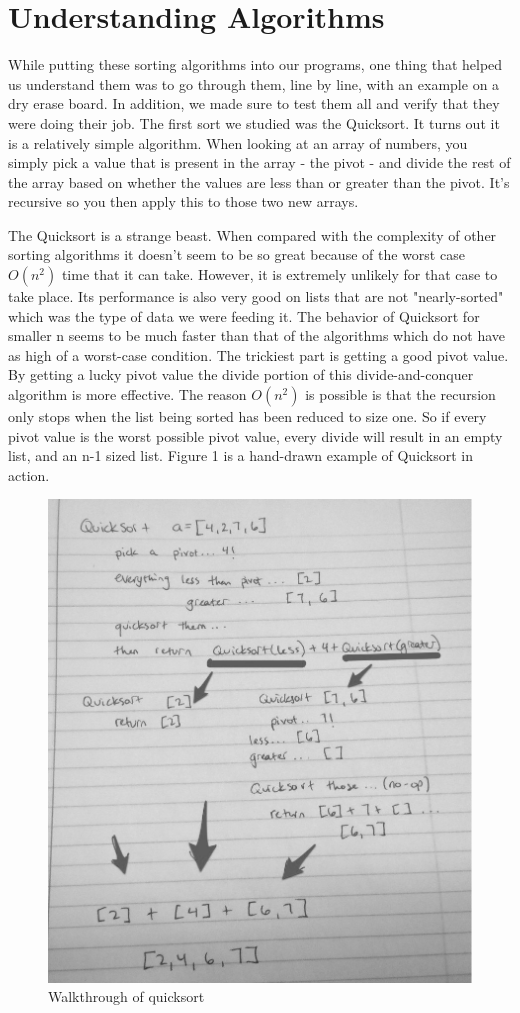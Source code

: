\documentclass[12pt]{amsart}
\begin{document}
\section*{Understanding Algorithms}

While putting these sorting algorithms into our programs, one thing that helped
us understand them was to go through them, line by line, with an example on a
dry erase board. In addition, we made sure to test them all and verify that they
were doing their job. The first sort we studied was the Quicksort. It turns out
it is a relatively simple algorithm. When looking at an array of numbers, you
simply pick a value that is present in the array - the pivot - and divide the 
rest of the array based on whether the values are less than or greater than the 
pivot. It's recursive so you then apply this to those two new arrays.

The Quicksort is a strange beast. When compared with the complexity of other
sorting algorithms it doesn't seem to be so great because of the worst case $O(n^2)$ time that it can take. However, it is extremely unlikely for that case to take place. Its performance is also very good on lists that are not "nearly-sorted" which was the type of data we were feeding it.  The behavior of Quicksort for smaller n seems to be much faster than that of the algorithms which do not have as high of a worst-case condition. The
trickiest part is getting a good pivot value. By getting a lucky pivot value the
divide portion of this divide-and-conquer algorithm is more effective. The
reason $O(n^2)$ is possible is that the recursion only stops when the list being
sorted has been reduced to size one. So if every pivot value is the worst
possible pivot value, every divide will result in an empty list, and an n-1
sized list. Figure 1 is a hand-drawn example of Quicksort in action.
\begin{figure}[h]
  \centering
    \includegraphics[width=.7\textwidth]{quicksort-drawing.jpg}
  \caption{Walkthrough of quicksort}
\end{figure}
\end{document}
